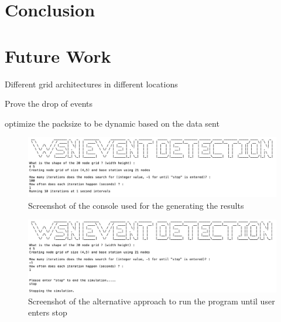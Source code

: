 \documentclass[conference]{IEEEtran}
\begin{document}
	
	\section{Conclusion}
	
	\section{Future Work}
	
	Different grid architectures in different locations
	
	Prove the drop of events
	
	optimize the packsize to be dynamic based on the data sent
	
	

	



	\newpage
	\onecolumn
	\appendix
	
	
\begin{figure}[h]
	\centering
	\includegraphics[width=6in,keepaspectratio]{console1}
	\caption{Screenshot of the console used for the generating the results}
	\label{screen 1}
\end{figure}

\begin{figure}[h]
	\centering
	\includegraphics[width=6in,keepaspectratio]{console2}
	\caption{Screenshot of the alternative approach to run the program until user enters stop}
	\label{screen 2}
\end{figure}
\end{document}
